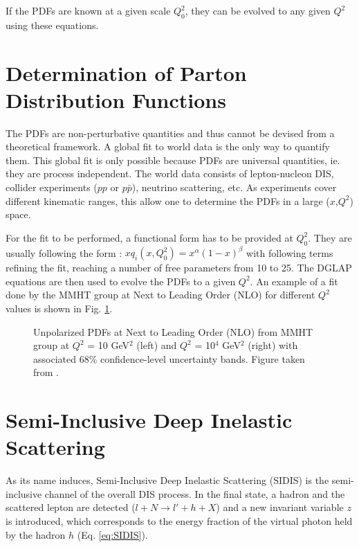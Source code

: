 If the PDFs are known at a given scale $Q_0^2$, they can be evolved to any given $Q^2$ using these equations.


\section{Determination of Parton Distribution Functions}

The PDFs are non-perturbative quantities and thus cannot be devised from a theoretical framework. A global fit to world data is the
only way to quantify them. This global fit is only possible because PDFs are universal quantities, ie. they are process independent.
The world data consists of lepton-nucleon DIS, collider experiments ($pp$ or $p\bar{p}$), neutrino scattering, etc. As experiments
cover different kinematic ranges, this allow one to determine the PDFs in a large ($x$,$Q^2$) space.

For the fit to be performed, a functional form has to be provided at $Q^2_0$. They are usually following the form : $xq_i(x,Q^2_0) = x^{\alpha}(1-x)^{\beta}$
with following terms refining the fit, reaching a number of free parameters from 10 to 25. The DGLAP equations are then used to evolve
the PDFs to a given $Q^2$. An example of a fit done by the MMHT group at Next to Leading Order (NLO) for different $Q^2$ values is shown in Fig. \ref{fig:MMHT}.

\begin{figure}[htb!]
\centerline{}
\caption{Unpolarized PDFs at Next to Leading Order (NLO) from MMHT group at $Q^2$ = 10 GeV$^2$ (left) and $Q^2$ = 10$^4$ GeV$^2$ (right) with associated 68\%
confidence-level uncertainty bands. Figure taken from \cite{MMHT}.}\label{fig:MMHT}
\end{figure}


\section{Semi-Inclusive Deep Inelastic Scattering}

As its name induces, Semi-Inclusive Deep Inelastic Scattering (SIDIS) is the semi-inclusive channel of the overall DIS process. In the
final state, a hadron and the scattered lepton are detected ($l+N \rightarrow l'+h+X$) and a new invariant variable $z$ is introduced,
which corresponds to the energy fraction of the virtual photon held by the hadron $h$ (Eq. \ref{eq:SIDIS}).

